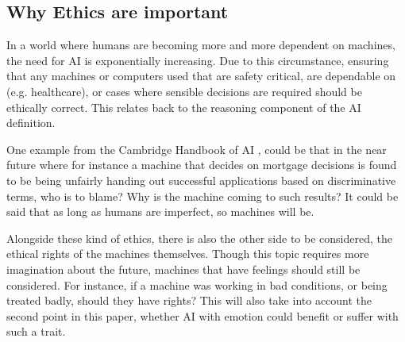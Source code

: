 \documentclass[article]{IEEEtran}
\begin{document}
\subsection{Why Ethics are important}
In a world where humans are becoming more and more dependent on machines, the need for AI is exponentially increasing. Due to this circumstance, ensuring that any machines or computers used that are safety critical, are dependable on (e.g. healthcare), or cases where sensible decisions are required should be ethically correct. This relates back to the reasoning component of the AI definition. \par
One example from the Cambridge Handbook of AI \cite{ethics important}, could be that in the near future where for instance a machine that decides  on mortgage decisions is found to be being unfairly handing out successful applications based on discriminative terms, who is to blame? Why is the machine coming to such results? It could be said that as long as humans are imperfect, so machines will be. \par
Alongside these kind of ethics, there is also the other side to be considered, the ethical rights of the machines themselves. Though this topic requires more imagination about the future, machines that have feelings should still be considered. For instance, if a machine was working in bad conditions, or being treated badly, should they have rights? This will also take into account the second point in this paper, whether AI with emotion could benefit or suffer with such a trait.
\end{document}
